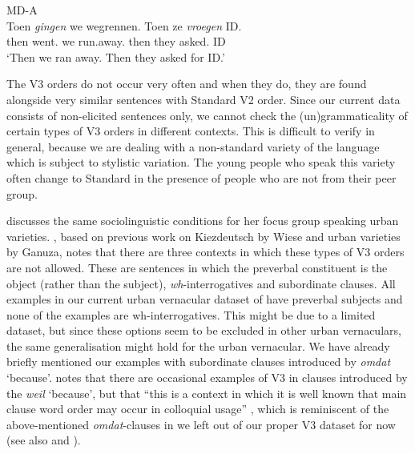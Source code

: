 \documentclass[output=paper]{langsci/langscibook}
\begin{document}
\ea\label{exdisV3} MD-A\\
    \gll Toen \textit{gingen} we wegrennen. Toen ze \textit{vroegen} ID.\\
    then went.\Pl{} we run.away.\Inf{} then they asked.\Pl{} ID\\
    \trans \enquote*{Then we ran away. Then they asked for ID.}
\z

\noindent The V3 orders do not occur very often and when they do, they are
found alongside very similar sentences with Standard  V2 order. Since our
current data consists of non-elicited sentences only, we cannot check the
(un)grammaticality of certain types of V3 orders in different contexts. This is
difficult to verify in general, because we are dealing with a non-standard
variety of the language which is subject to stylistic variation. The young
people who speak this variety often change to Standard  in the presence of
people who are not from their peer group.

\citet[109--130]{Ganuza:2008} discusses the same sociolinguistic conditions for
her focus group speaking  urban varieties. \citet{Walkden:2016}, based on
previous work on Kiezdeutsch by Wiese and  urban varieties by Ganuza,
notes that there are three contexts in which these types of V3 orders are not
allowed. These are sentences in which the preverbal constituent is the object
(rather than the subject), \emph{wh}-interrogatives and subordinate clauses.
All examples in our current urban vernacular dataset of  have preverbal
subjects and none of the examples are wh-interrogatives. This might be due to a
limited dataset, but since these options seem to be excluded in other urban
vernaculars, the same generalisation might hold for the  urban vernacular.
We have already briefly mentioned our examples with subordinate clauses
introduced by \emph{omdat} `because'. \citet{Walkden:2017} notes that there are
occasional examples of V3 in clauses introduced by the  \emph{weil}
`because', but that \enquote{this is a context in which it is well known that
main clause word order may occur in colloquial usage} \citep{Walkden:2017},
which is reminiscent of the above-mentioned \emph{omdat}-clauses in  we
left out of our proper V3 dataset for now (see also
\citealt{AntomoSteinbach:2010} and \citealt{Reis:2013}).

\end{document}
